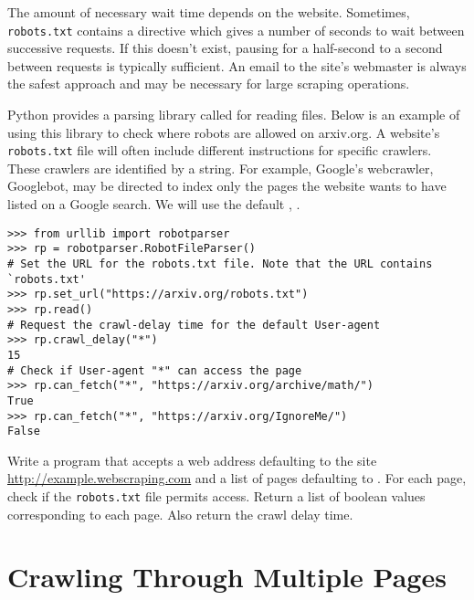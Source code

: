 The amount of necessary wait time depends on the website.
Sometimes, \texttt{robots.txt} contains a  directive which gives a number of seconds to wait between successive requests.
If this doesn't exist, pausing for a half-second to a second between requests is typically sufficient.
An email to the site's webmaster is always the safest approach and may be necessary for large scraping operations.

Python provides a parsing library called  for reading  files.
Below is an example of using this library to check where robots are allowed on arxiv.org.
A website's \texttt{robots.txt} file will often include different instructions for specific crawlers.
These crawlers are identified by a  string.
For example, Google's webcrawler,  Googlebot, may be directed to index only the pages the website wants to have listed on a Google search.
We will use the default , .

\begin{lstlisting}
>>> from urllib import robotparser
>>> rp = robotparser.RobotFileParser()
# Set the URL for the robots.txt file. Note that the URL contains `robots.txt'
>>> rp.set_url("https://arxiv.org/robots.txt")
>>> rp.read()
# Request the crawl-delay time for the default User-agent
>>> rp.crawl_delay("*")
15
# Check if User-agent "*" can access the page
>>> rp.can_fetch("*", "https://arxiv.org/archive/math/")
True
>>> rp.can_fetch("*", "https://arxiv.org/IgnoreMe/")
False
\end{lstlisting}

\begin{problem} %
Write a program that accepts a web address defaulting to the site \url{http://example.webscraping.com} and a list of pages defaulting to .
For each page, check if the \texttt{robots.txt} file permits access.
Return a list of boolean values corresponding to each page.
Also return the crawl delay time.
\label{problem:robots-file}
\end{problem}

\section*{Crawling Through Multiple Pages} %

